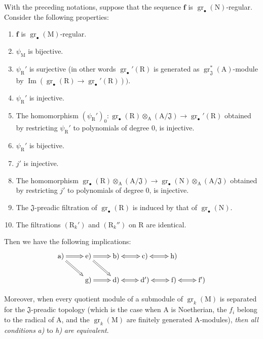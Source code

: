 \begin{proposition}[19.6.3]
\label{IV.19.6.3}
With the preceding notations, suppose that the sequence $\mathbf{f}$ is $\operatorname{gr}_\bullet(\mathrm{N})$-regular. Consider the following properties:
\begin{enumerate}
\item[\rm a)] $\mathbf{f}$ is $\operatorname{gr}_\bullet(\mathrm{M})$-regular.
\item[\rm b)] $\psi_\mathrm{M}$ is bijective.
\item[\rm c)] $\psi_\mathrm{R}'$ is surjective (in other words $\operatorname{gr}_\bullet'(\mathrm{R})$ is generated as $\operatorname{gr}_\mathfrak{J}^*(\mathrm{A})$-module by $\operatorname{Im}(\operatorname{gr}_\bullet(\mathrm{R})\to\operatorname{gr}_\bullet'(\mathrm{R})))$.
\item[\rm d)] $\psi_\mathrm{R}'$ is injective.
\item[\rm d$'$)] The homomorphism $(\psi_\mathrm{R}')_0:\operatorname{gr}_\bullet(\mathrm{R})\otimes_\mathrm{A}(\mathrm{A}/\mathfrak{J})\to\operatorname{gr}_\bullet'(\mathrm{R})$ obtained by restricting $\psi_\mathrm{R}'$ to polynomials of degree $0$, is injective.
\item[\rm e)] $\psi_\mathrm{R}'$ is bijective.
\item[\rm f)] $j'$ is injective.
\item[\rm f$'$)] The homomorphism $\operatorname{gr}_\bullet(\mathrm{R})\otimes_\mathrm{A}(\mathrm{A}/\mathfrak{J})\to\operatorname{gr}_\bullet(\mathrm{N})\otimes_\mathrm{A}(\mathrm{A}/\mathfrak{J})$ obtained by restricting $j'$ to polynomials of degree $0$, is injective.
\item[\rm g)] The $\mathfrak{J}$-preadic filtration of $\operatorname{gr}_\bullet(\mathrm{R})$ is induced by that of $\operatorname{gr}_\bullet(\mathrm{N})$.
\item[\rm h)] The filtrations $(\mathrm{R}_k')$ and $(\mathrm{R}_k'')$ on $\mathrm{R}$ are identical.
\end{enumerate}
Then we have the following implications:
\[
\xymatrix@C=2.4em@R=1.8em{
  \text{a)} \ar@{=>}[r] \ar@{=>}[dr] &
  \text{e)} \ar@{=>}[r] \ar@{=>}[dr] &
  \text{b)} \ar@{<=>}[r] &
  \text{c)} \ar@{<=>}[r] &
  \text{h)} \\
  & \text{g)} \ar@{=>}[r] &
  \text{d)} \ar@{<=>}[r] &
  \text{d$'$)} \ar@{<=>}[r] &
  \text{f)} \ar@{<=>}[r] &
  \text{f$'$)}
}
\]

Moreover, when every quotient module of a submodule of $\operatorname{gr}_k(\mathrm{M})$ is separated for the $\mathfrak{J}$-preadic topology (which is the case when $\mathrm{A}$ is Noetherian, the $f_i$ belong to the radical of $\mathrm{A}$, and the $\operatorname{gr}_k(\mathrm{M})$ are finitely generated $\mathrm{A}$-modules), \emph{then all conditions} \emph{a)} to \emph{h)} \emph{are equivalent}.
\end{proposition}


